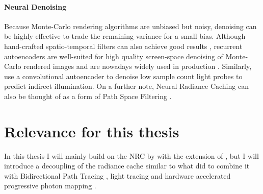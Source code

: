 \paragraph{Neural Denoising}
Because Monte-Carlo rendering algorithms are unbiased but noisy, denoising can be highly effective to trade the remaining variance for a small bias.
Although hand-crafted spatio-temporal filters can also achieve good results , recurrent autoencoders are well-suited for high quality screen-space denoising of Monte-Carlo rendered images  and are nowadays widely used in production .
Similarly, \textcite{jiang2020} use a convolutional autoencoder to denoise low sample count light probes to predict indirect illumination.
On a further note, Neural Radiance Caching  can also be thought of as a form of Path Space Filtering . %

\section{Relevance for this thesis}
In this thesis I will mainly build on the NRC by \textcite{muller2021} with the extension of \textcite{muller2022}, but I will introduce a decoupling of the radiance cache similar to what \textcite{walter1999,tole2002} did to combine it with Bidirectional Path Tracing , light tracing  and hardware accelerated progressive photon mapping .